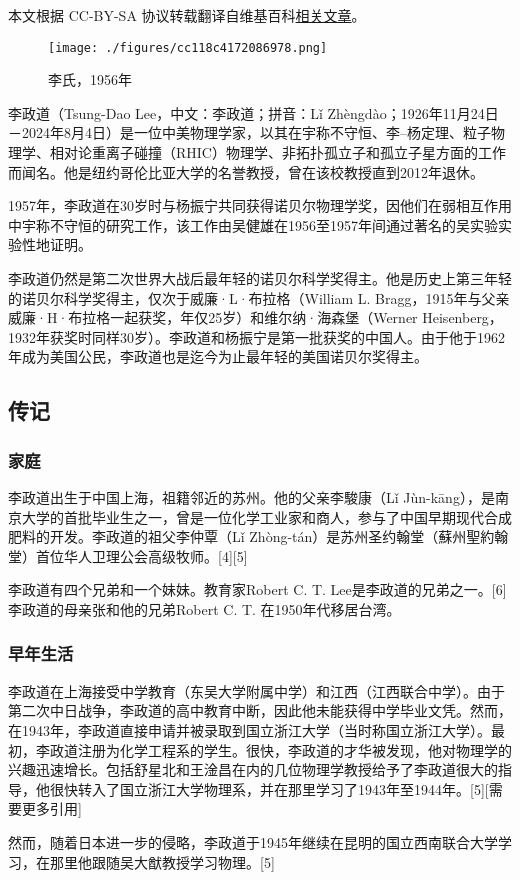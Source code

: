 
本文根据 CC-BY-SA 协议转载翻译自维基百科\href{https://en.wikipedia.org/wiki/Tsung-Dao_Lee}{相关文章}。

\begin{figure}[ht]
\centering
\texttt{[image: ./figures/cc118c4172086978.png]}
\caption{李氏，1956年} \label{fig_Tsung_1}
\end{figure}
李政道（Tsung-Dao Lee，中文：李政道；拼音：Lǐ Zhèngdào；1926年11月24日－2024年8月4日）是一位中美物理学家，以其在宇称不守恒、李–杨定理、粒子物理学、相对论重离子碰撞（RHIC）物理学、非拓扑孤立子和孤立子星方面的工作而闻名。他是纽约哥伦比亚大学的名誉教授，曾在该校教授直到2012年退休。

1957年，李政道在30岁时与杨振宁共同获得诺贝尔物理学奖，因他们在弱相互作用中宇称不守恒的研究工作，该工作由吴健雄在1956至1957年间通过著名的吴实验实验性地证明。

李政道仍然是第二次世界大战后最年轻的诺贝尔科学奖得主。他是历史上第三年轻的诺贝尔科学奖得主，仅次于威廉·L·布拉格（William L. Bragg，1915年与父亲威廉·H·布拉格一起获奖，年仅25岁）和维尔纳·海森堡（Werner Heisenberg，1932年获奖时同样30岁）。李政道和杨振宁是第一批获奖的中国人。由于他于1962年成为美国公民，李政道也是迄今为止最年轻的美国诺贝尔奖得主。
\subsection{传记}  
\subsubsection{家庭}  
李政道出生于中国上海，祖籍邻近的苏州。他的父亲李駿康（Lǐ Jùn-kāng），是南京大学的首批毕业生之一，曾是一位化学工业家和商人，参与了中国早期现代合成肥料的开发。李政道的祖父李仲覃（Lǐ Zhòng-tán）是苏州圣约翰堂（蘇州聖約翰堂）首位华人卫理公会高级牧师。[4][5]

李政道有四个兄弟和一个妹妹。教育家Robert C. T. Lee是李政道的兄弟之一。[6] 李政道的母亲张和他的兄弟Robert C. T. 在1950年代移居台湾。
\subsubsection{早年生活}  
李政道在上海接受中学教育（东吴大学附属中学）和江西（江西联合中学）。由于第二次中日战争，李政道的高中教育中断，因此他未能获得中学毕业文凭。然而，在1943年，李政道直接申请并被录取到国立浙江大学（当时称国立浙江大学）。最初，李政道注册为化学工程系的学生。很快，李政道的才华被发现，他对物理学的兴趣迅速增长。包括舒星北和王淦昌在内的几位物理学教授给予了李政道很大的指导，他很快转入了国立浙江大学物理系，并在那里学习了1943年至1944年。[5][需要更多引用]

然而，随着日本进一步的侵略，李政道于1945年继续在昆明的国立西南联合大学学习，在那里他跟随吴大猷教授学习物理。[5]
